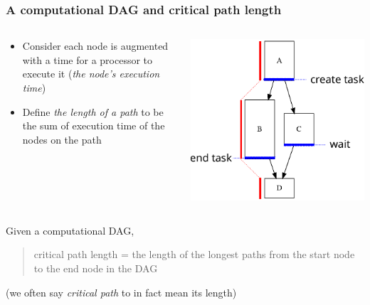 \documentclass[12pt,dvipdfmx]{beamer}
\newcommand{\ao}[1]{{\color{blue}#1}}
\begin{document}
\begin{frame}[fragile]
\frametitle{A computational DAG and critical path length}
\begin{columns}[t]
\begin{column}{0.65\textwidth}
\begin{itemize}
\item Consider each node is augmented with a time
  for a processor to execute it 
  (\ao{\em the node's execution time})

\item Define {\em the length of a path} to be the
  sum of execution time of the nodes on the path
\end{itemize}

\end{column}

\begin{column}{0.35\textwidth}
\begin{center}
\includegraphics[width=\textwidth]{out/pdf/svg/dag_cp.pdf}
\end{center}
\end{column}
\end{columns}

Given a computational DAG,
\begin{quote}
\ao{critical path length 
  = the length of the longest 
  paths from the start node to the end node in the DAG}
\end{quote}

(we often say {\em critical path} to in fact mean its length)
\end{frame}
\end{document}
